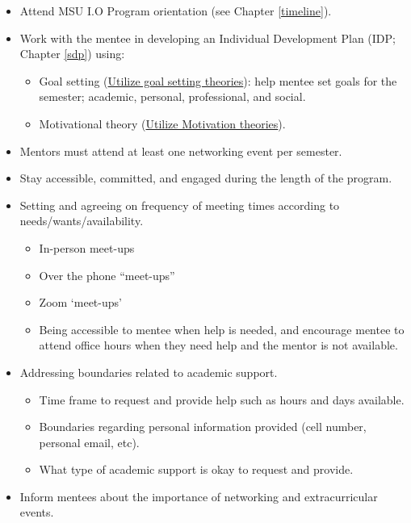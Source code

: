 \documentclass[
  openany]{book}
\providecommand{\tightlist}{%
  \setlength{\itemsep}{0pt}\setlength{\parskip}{0pt}}
\begin{document}
\begin{itemize}
\tightlist
\item
  Attend MSU I.O Program orientation (see Chapter \ref{timeline}).
\item
  Work with the mentee in developing an Individual Development Plan (IDP; Chapter \ref{sdp}) using:

  \begin{itemize}
  \tightlist
  \item
    Goal setting (\href{https://piximus.net/media/12860/funny-demotivational-posters-86-28.jpg}{Utilize goal setting theories}): help mentee set goals for the semester; academic, personal, professional, and social.
  \item
    Motivational theory (\href{https://youtu.be/cgg9byUy-V4}{Utilize Motivation theories}).
  \end{itemize}
\item
  Mentors must attend at least one networking event per semester.
\item
  Stay accessible, committed, and engaged during the length of the program.\\
\item
  Setting and agreeing on frequency of meeting times according to needs/wants/availability.

  \begin{itemize}
  \tightlist
  \item
    In-person meet-ups
  \item
    Over the phone ``meet-ups''
  \item
    Zoom `meet-ups'
  \item
    Being accessible to mentee when help is needed, and encourage mentee to attend office hours when they need help and the mentor is not available.
  \end{itemize}
\item
  Addressing boundaries related to academic support.

  \begin{itemize}
  \tightlist
  \item
    Time frame to request and provide help such as hours and days available.
  \item
    Boundaries regarding personal information provided (cell number, personal email, etc).
  \item
    What type of academic support is okay to request and provide.
  \end{itemize}
\item
  Inform mentees about the importance of networking and extracurricular events.


\end{itemize}
\end{document}
